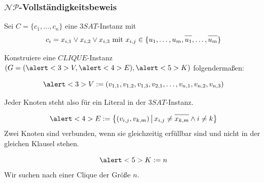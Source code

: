 
\begin{frame}
\frametitle{$\mathcal{NP}$-Vollständigkeitsbeweis}
Sei $C = \{c_1, \ldots, c_n\}$ eine $3SAT$-Instanz mit 
$$ c_i = x_{i,1} \vee x_{i,2} \vee x_{i,3} \mbox{ mit } x_{i,j} \in \{u_1,\ldots,u_m,\neglit{u_1},\ldots,\neglit{u_m}\} $$

\pause

Konstruiere eine $CLIQUE$-Instanz $(G = (\alert<3>{V}, \alert<4>{E}), \alert<5>{K})$ folgendermaßen:

\pause

$$\alert<3>{V} := (v_{1,1}, v_{1,2}, v_{1,3}, v_{2,1},\ldots,v_{n,1},v_{n,2},v_{n,3})$$

Jeder Knoten steht also für ein Literal in der $3SAT$-Instanz. 

\pause

$$\alert<4>{E} := \menge{(v_{i,j},v_{k,m})}{x_{i,j} \neq \neglit{x_{k,m}} \wedge i \neq k}$$%
Zwei Knoten sind verbunden, wenn sie gleichzeitig erfüllbar sind und nicht in der gleichen Klausel stehen. 

\pause 
$$\alert<5>{K} := n$$
Wir suchen nach einer Clique der Größe $n$.\\

\end{frame}

